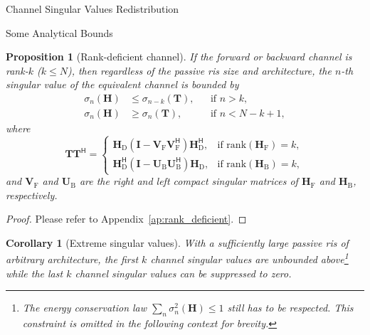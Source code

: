\documentclass[journal]{IEEEtran}
\newtheorem{proposition}{Proposition}
\newtheorem{corollary}{Corollary}[proposition]
\begin{document}
\begin{section}{Channel Singular Values Redistribution}
\begin{subsection}{Some Analytical Bounds}
		\begin{proposition}[Rank-deficient channel]\label{pp:rank_deficient}
			If the forward or backward channel is rank-$k$ ($k \le N$), then regardless of the passive \gls{ris} size and architecture, the $n$-th singular value of the equivalent channel is bounded by
			\begin{subequations}
				\begin{align}
					\sigma_n(\mathbf{H}) & \le \sigma_{n-k}(\mathbf{T}), &  & \text{if } n > k, \label{iq:sv_bound_enlarge}          \\
					\sigma_n(\mathbf{H}) & \ge \sigma_n(\mathbf{T}),     &  & \text{if } n < N - k + 1, \label{iq:sv_bound_suppress}
				\end{align}
				\label{iq:sv_bound_rank_deficient}
			\end{subequations}
			where
			\begin{equation}
				\mathbf{T} \mathbf{T}^\mathsf{H} =
				\begin{cases}
					\mathbf{H}_\mathrm{D} (\mathbf{I} - \mathbf{V}_\mathrm{F} \mathbf{V}_\mathrm{F}^\mathsf{H}) \mathbf{H}_\mathrm{D}^\mathsf{H}, & \text{if } \mathrm{rank}(\mathbf{H}_\mathrm{F}) = k, \\
					\mathbf{H}_\mathrm{D}^\mathsf{H} (\mathbf{I} - \mathbf{U}_\mathrm{B} \mathbf{U}_\mathrm{B}^\mathsf{H}) \mathbf{H}_\mathrm{D}, & \text{if } \mathrm{rank}(\mathbf{H}_\mathrm{B}) = k,
				\end{cases}
				\label{eq:auxiliary_matrix}
			\end{equation}
			and $\mathbf{V}_\mathrm{F}$ and $\mathbf{U}_\mathrm{B}$ are the right and left compact singular matrices of $\mathbf{H}_\mathrm{F}$ and $\mathbf{H}_\mathrm{B}$, respectively.
		\end{proposition}
		\begin{proof}
			Please refer to Appendix~\ref{ap:rank_deficient}.
		\end{proof}

		\begin{corollary}[Extreme singular values\label{co:extreme}]
			With a sufficiently large passive \gls{ris} of arbitrary architecture, the first $k$ channel singular values are unbounded above\footnote{The energy conservation law $\sum_n \sigma_n^2(\mathbf{H}) \le 1$ still has to be respected. This constraint is omitted in the following context for brevity.} while the last $k$ channel singular values can be suppressed to zero.
		\end{corollary}


\end{subsection}
\end{section}
\end{document}
